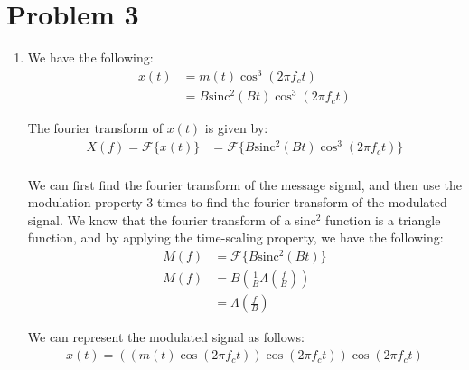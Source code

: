 \documentclass{article}
\begin{document}
\section{Problem 3}
\begin{enumerate}[label=3.\arabic*]
    \item We have the following:
    \begin{align*}
        x(t) &= m(t) \cos^3\left(2\pi f_c t\right) \\
        &= B \text{sinc}^2\left(Bt\right) \cos^3\left(2\pi f_c t\right)
    \end{align*}

    The fourier transform of $x(t)$ is given by:
    \begin{align*}
        X(f) =  \mathcal{F}\{x(t)\} &= \mathcal{F}\{B \text{sinc}^2\left(Bt\right) \cos^3\left(2\pi f_c t\right)\} \\
    \end{align*}

    We can first find the fourier transform of the message signal, and then use the modulation property 3 times to find the fourier transform of the modulated signal.
    We know that the fourier transform of a sinc$^2$ function is a triangle function, and by applying the time-scaling property, we have the following:
    \begin{align*}
        M(f) &= \mathcal{F}\{B \text{sinc}^2\left(Bt\right)\} \\
        M(f) &= B \left(\frac{1}{B}\Lambda\left(\frac{f}{B}\right)\right) \\
        &= \Lambda\left(\frac{f}{B}\right)
    \end{align*}

    We can represent the modulated signal as follows:
    \begin{align*}
        x(t) = ((m(t) \cos(2\pi f_c t)) \cos(2\pi f_c t) ) \cos(2\pi f_c t)
    \end{align*}


\end{enumerate}
\end{document}
